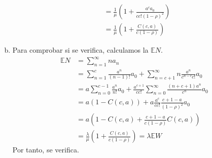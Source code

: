 \documentclass[twoside]{article}
\begin{document}
\begin{solucion}
\begin{enumerate}[(a)]
\begin{align*}
&= \frac{1}{\mu}\left( 1 + \frac{a^c a_0}{c c! (1-\rho)^2}\right)\\ 
&= \frac{1}{\mu}\left( 1+ \frac{C(c,a)}{c(1-\rho)}\right) 
\end{align*}
\item Para comprobar si se verifica, calculamos la $\mathbb{E}N$.
\begin{align*}
\mathbb{E}N &= \sum_{n=1}^\infty n a_n \\
&=  \sum_{n=1}^{c} \frac{a^n}{(n-1)!}a_0 + \sum_{n=c+1}^\infty n\frac{a^n}{c^{n-c}c!}a_0\\
&= a\sum_{n=0}^{c-1} \frac{a^n}{n!}a_0 + \frac{a^{c+1}}{c c!}\sum_{n=0}^\infty \frac{(n+c+1)a^n}{c^n}a_0\\
&= a(1-C(c,a)) + a \frac{a^c}{cc!}\frac{c+1-a}{(1-\rho)^2}a_0\\
&= a\left(1 - C(c,a) + \frac{c+1-a}{c(1-\rho)}C(c,a)\right)\\
&= \frac{\lambda}{\mu}\left(1 + \frac{C(c,a)}{c(1-\rho)}\right) = \lambda \mathbb{E}W
\end{align*}
Por tanto, se verifica.
\end{enumerate}
\end{solucion}
\end{document}
